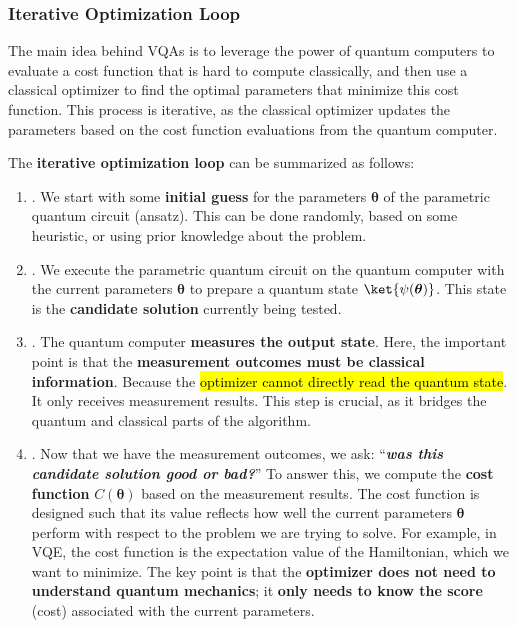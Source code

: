\subsubsection{Iterative Optimization Loop}\label{sec:iterative-optimization-loop}

The main idea behind VQAs is to leverage the power of quantum computers to evaluate a cost function that is hard to compute classically, and then use a classical optimizer to find the optimal parameters that minimize this cost function. This process is iterative, as the classical optimizer updates the parameters based on the cost function evaluations from the quantum computer.

\highspace
The \textbf{iterative optimization loop} can be summarized as follows:
\begin{enumerate}
    \item {}. We start with some \textbf{initial guess} for the parameters $\boldsymbol{\theta}$ of the parametric quantum circuit (ansatz). This can be done randomly, based on some heuristic, or using prior knowledge about the problem.
    
    
    \item {}. We execute the parametric quantum circuit on the quantum computer with the current parameters $\boldsymbol{\theta}$ to prepare a quantum state $\ket{\psi(\boldsymbol{\theta})}$. This state is the \textbf{candidate solution} currently being tested.
    
    
    \item {}. The quantum computer \textbf{measures the output state}. Here, the important point is that the \textbf{measurement outcomes must be classical information}. Because the \hl{optimizer cannot directly read the quantum state}. It only receives measurement results. This step is crucial, as it bridges the quantum and classical parts of the algorithm.
    
    
    \item {}. Now that we have the measurement outcomes, we ask: ``\emph{\textbf{was this candidate solution good or bad?}}'' To answer this, we compute the \textbf{cost function} $C(\boldsymbol{\theta})$ based on the measurement results. The cost function is designed such that its value reflects how well the current parameters $\boldsymbol{\theta}$ perform with respect to the problem we are trying to solve. For example, in VQE, the cost function is the expectation value of the Hamiltonian, which we want to minimize. The key point is that the \textbf{optimizer does not need to understand quantum mechanics}; it \textbf{only needs to know the score} (cost) associated with the current parameters.
    

\end{enumerate}
